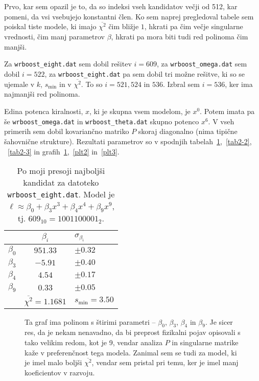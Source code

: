 \documentclass[a4 paper, 12pt]{article}
\begin{document}
Prvo, kar sem opazil je to, da so indeksi vseh kandidatov ve\v cji od 512, kar pomeni, da vsi vsebujejo konstantni \v clen.
Ko sem naprej pregledoval tabele sem poiskal tiste modele, ki imajo $\overline{\chi^2}$ \v cim bli\v zje $1$, hkrati pa
\v cim ve\v cje singularne vrednosti, \v cim manj parametrov $\beta$, hkrati pa mora biti tudi red polinoma \v cim manj\v si.

Za {\tt wrboost\_eight.dat} sem dobil re\v sitev $i = 609$, za {\tt wrboost\_omega.dat} sem dobil $i = 522$, za
{\tt wrboost\_eight.dat} pa sem dobil tri mo\v zne re\v sitve, ki so se ujemale v $k$, $s_\text{min}$ in v $\overline{\chi^2}$.
To so $i = 521, 524$ in $536$. Izbral sem $i = 536$, ker ima najmanj\v si red polinoma.

Edina potenca kiralnosti, $x$, ki je skupna vsem modelom, je $x^0$. Potem imata pa \v se {\tt wrboost\_omega.dat} in
{\tt wrboost\_theta.dat} skupno potenco $x^6$. V vseh primerih sem dobil kovarian\v cno matriko $P$ skoraj diagonalno
(nima tipi\v cne \v sahovni\v cne strukture). Rezultati parametrov so v spodnjih tabelah~\ref{tab2-1},~\ref{tab2-2},
~\ref{tab2-3} in grafih~\ref{plt1},~\ref{plt2} in~\ref{plt3}.

\begin{table}[H]\centering
	\caption{Po moji presoji najbolj\v si kandidat za datoteko {\tt wrboost\_eight.dat}. Model je $\ell \approx
		\beta_0 + \beta_3 x^3 + \beta_4 x^4 + \beta_9 x^9$, tj. $609_{10} = 1001100001_{2}$.}
	\begin{tabular}{r|c|l}
			& $\beta_i$ & $\sigma_{\beta_i}$  \\
		\hline \hline
		$\beta_0$ & $951.33$ & $\pm 0.32$ \\
		$\beta_3$ & $-5.91$  & $\pm 0.40$ \\
		$\beta_4$ & $4.54$   & $\pm 0.17$ \\
		$\beta_9$ & $0.33$   & $\pm 0.05$ \\
		\hline
			& $\overline{\chi^2} = 1.1681$ & $s_\text{min} = 3.50$
	\end{tabular}
	\label{tab2-1}
\end{table}

\begin{figure}[H]\centering
	
	\caption{Ta graf ima polinom s \v stirimi parametri -- $\beta_0$, $\beta_3$, $\beta_4$ in $\beta_9$. Je sicer
		res, da je nekam nenavadno, da bi preprost fizikalni pojav opisovali s tako velikim redom, kot je 9,
		vendar analiza $P$ in singularne matrike ka\v ze v preferen\v cnost tega modela. Zanimal sem se tudi
		za model, ki je imel malo bolj\v si $\overline{\chi^2}$, vendar sem pristal pri temu, ker je imel manj
		koeficientov v razvoju.}
	\label{plt1}
\end{figure}
\end{document}
